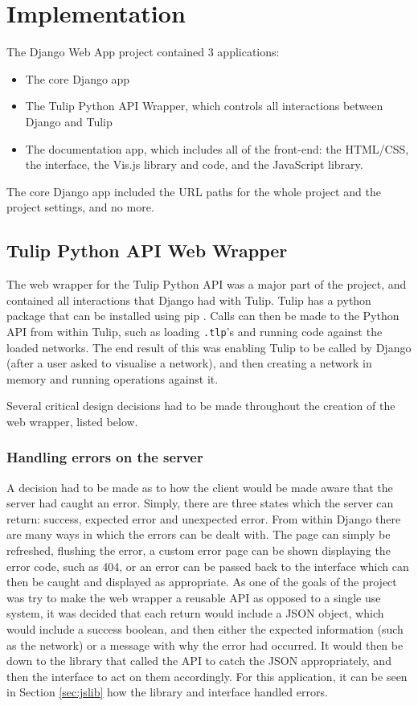 \documentclass[../dissertation.tex]{subfiles}
\begin{document}
\chapter{Implementation}

The Django Web App project contained 3 applications: 

\begin{itemize}
    \item The core Django app
    \item The Tulip Python API Wrapper, which controls all interactions between Django and Tulip
    \item The documentation app, which includes all of the front-end: the HTML/CSS, the interface, the Vis.js library and code, and the JavaScript library.
\end{itemize}

The core Django app included the URL paths for the whole project and the project settings, and no more.

\section{Tulip Python API Web Wrapper}

The web wrapper for the Tulip Python API was a major part of the project, and contained all interactions that Django had with Tulip. Tulip has a python package \cite{tulippip} that can be installed using pip \cite{pip}. Calls can then be made to the Python API from within Tulip, such as loading \texttt{.tlp}'s and running code against the loaded networks. The end result of this was enabling Tulip to be called by Django (after a user asked to visualise a network), and then creating a network in memory and running operations against it. 

Several critical design decisions had to be made throughout the creation of the web wrapper, listed below.

\subsection{Handling errors on the server}

A decision had to be made as to how the client would be made aware that the server had caught an error. Simply, there are three states which the server can return: success, expected error and unexpected error. From within Django there are many ways in which the errors can be dealt with. The page can simply be refreshed, flushing the error, a custom error page can be shown displaying the error code, such as 404, or an error can be passed back to the interface which can then be caught and displayed as appropriate. As one of the goals of the project was try to make the web wrapper a reusable API as opposed to a single use system, it was decided that each return would include a JSON object, which would include a success boolean, and then either the expected information (such as the network) or a message with why the error had occurred. It would then be down to the library that called the API to catch the JSON appropriately, and then the interface to act on them accordingly. For this application, it can be seen in Section \ref{sec:jslib} how the library and interface handled errors.
\end{document}
